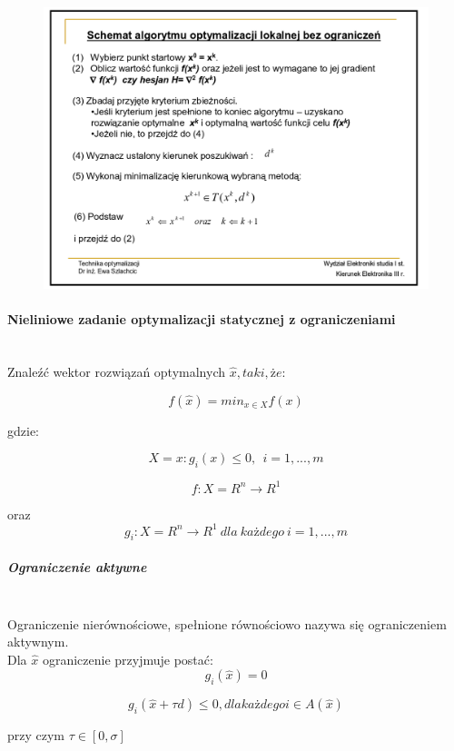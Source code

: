 \documentclass[a4paper,twoside]{report}
\begin{document}
		\begin{figure}[H]
			\includegraphics[scale=0.5
			]{obrazy/optymalizacja/opt9.png}
		\end{figure} 
		
		
		
		
		\paragraph{Nieliniowe zadanie optymalizacji statycznej z ograniczeniami\\\\}
		Znaleźć wektor rozwiązań optymalnych $\hat{x}, taki, że:$
		
		$$f(\hat{x})=min_{x \in X}f(x)$$
		
		gdzie:
		
		$$X={x:g_i(x) \le 0,~~i=1,...,m}$$
		
		$$f:X = R^n \longrightarrow R^1$$
		
		oraz $$g_i:X = R^n \longrightarrow R^1~dla~każdego~i=1,...,m$$
		
		\subparagraph{Ograniczenie aktywne\\\\}
		
		Ograniczenie nierównościowe, spełnione równościowo nazywa się ograniczeniem aktywnym.\\
		Dla $\hat{x}$ ograniczenie przyjmuje postać:
		\[  g_i(\hat{x})=0 \]
		
		
		$$ g_i(\hat{x}+\tau d) \le 0, dla każdego i \in A(\hat{x})$$
		
		przy czym $\tau \in [0,\sigma]$
		
		
		
\end{document}
